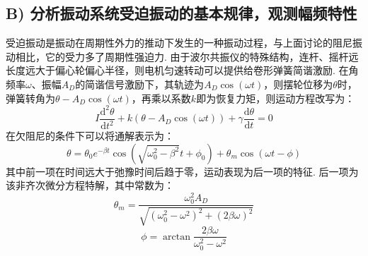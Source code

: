 \documentclass[UTF8]{ctexart}
\begin{document}
\subsection*{ B) 分析振动系统受迫振动的基本规律，观测幅频特性}
受迫振动是振动在周期性外力的推动下发生的一种振动过程，与上面讨论的阻尼振动相比，它的受力多了周期性强迫力. 由于波尔共振仪的特殊结构，连杆、摇杆远长度远大于偏心轮偏心半径，则电机匀速转动可以提供给卷形弹簧简谐激励. 在角频率$\omega$、振幅$A_D$的简谐信号激励下，其轨迹为$A_D\cos(\omega t)$，则摆轮位移为$\theta$时，弹簧转角为$\theta-A_D\cos(\omega t)$，再乘以系数$k$即为恢复力矩，则运动方程改写为：
\begin{equation}
I\frac{\mathrm{d}^2\theta}{\mathrm{d}t^2}+k(\theta-A_D\cos(\omega t))+\gamma\frac{\mathrm{d}\theta}{\mathrm{d}t}=0
\end{equation}
在欠阻尼的条件下可以将通解表示为：
\begin{equation}
\theta=\theta_0e^{-\beta t}\cos(\sqrt{\omega_0^2-\beta^2}t+\phi_0)+\theta_m\cos(\omega t-\phi)\label{tongjie}
\end{equation}
其中前一项在时间远大于弛豫时间后趋于零，运动表现为后一项的特征. 后一项为该非齐次微分方程特解，其中常数为：
\begin{equation}
\theta_m=\frac{\omega_0^2A_D}{\sqrt{(\omega_0^2-\omega^2)^2+(2\beta\omega)^2}}
\label{theta}
\end{equation}
\begin{equation}
\phi=\arctan\frac{2\beta\omega}{\omega_0^2-\omega^2}
\label{phi}
\end{equation}
\end{document}
